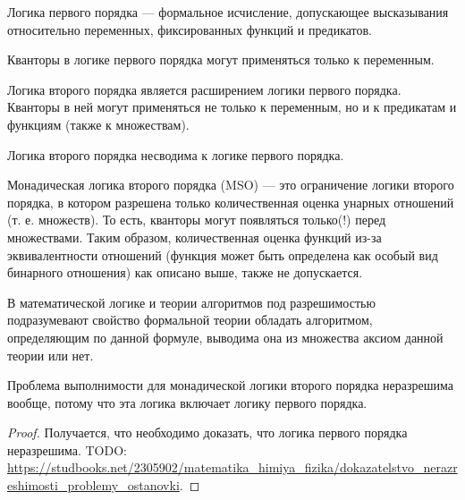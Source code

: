     \begin{Def}
        Логика первого порядка --- формальное исчисление, допускающее высказывания относительно переменных, фиксированных функций и предикатов.
    \end{Def}
    \begin{Rem}
        Кванторы в логике первого порядка могут применяться только к переменным.
    \end{Rem}
    \begin{Def}
        Логика второго порядка является расширением логики первого порядка. Кванторы в ней могут применяться не только к переменным, но и к предикатам и функциям (также к множествам).
    \end{Def}
    \begin{Rem}
        Логика второго порядка несводима к логике первого порядка.
    \end{Rem}
    \begin{Def}
        Монадическая логика второго порядка (MSO) — это ограничение логики второго порядка, в котором разрешена только количественная оценка унарных отношений (т. е. множеств). То есть, кванторы могут появляться только(!) перед множествами. Таким образом, количественная оценка функций из-за эквивалентности отношений (функция может быть определена как особый вид бинарного отношения) как описано выше, также не допускается.
    \end{Def}

    
    \begin{Def}
        В математической логике и теории алгоритмов под разрешимостью подразумевают свойство формальной теории обладать алгоритмом, определяющим по данной формуле, выводима она из множества аксиом данной теории или нет.
    \end{Def}
    \begin{Thm}
        Проблема выполнимости для монадической логики второго порядка неразрешима вообще, потому что эта логика включает логику первого порядка.
    \end{Thm}
    \begin{proof}
        Получается, что необходимо доказать, что логика первого порядка неразрешима. TODO: \url{https://studbooks.net/2305902/matematika_himiya_fizika/dokazatelstvo_nerazreshimosti_problemy_ostanovki}.
    \end{proof}
    

